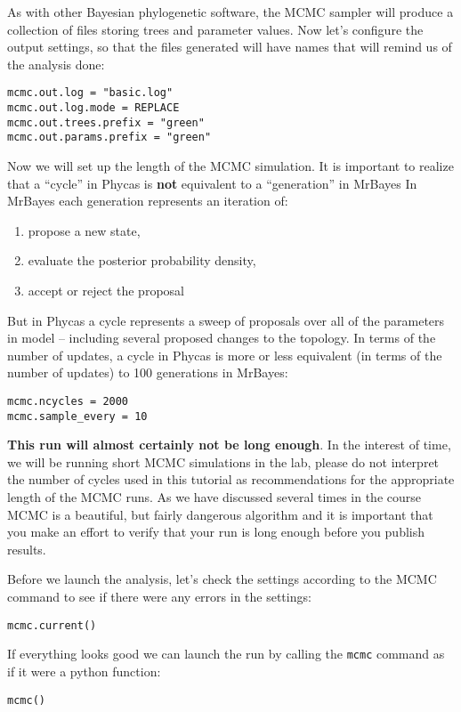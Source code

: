 \documentclass{article}
\newcommand{\cmd}[1]{\texttt{#1}\xspace}
\newcommand{\mb}{MrBayes\xspace}
\newcommand{\phycas}{Phycas\xspace}
\begin{document}
As with other Bayesian phylogenetic software, the MCMC sampler will produce a collection of files storing
trees and parameter values.
Now let's configure the output settings, so that the files generated will have names that 
will remind us of the analysis done:
\begin{verbatim}
mcmc.out.log = "basic.log"
mcmc.out.log.mode = REPLACE
mcmc.out.trees.prefix = "green"
mcmc.out.params.prefix = "green"
\end{verbatim}

Now we will set up the length of the MCMC simulation. 
It is important to realize that a ``cycle'' in \phycas is {\bf not}
equivalent to a ``generation'' in \mb \citet{RonquistH2003}
In \mb each generation represents an iteration of:
\begin{enumerate}
	\item propose a new state,
	\item evaluate the posterior probability density,
	\item accept or reject the proposal
\end{enumerate}
But in \phycas a cycle represents a sweep of proposals over all of the parameters
in model -- including several proposed changes to the topology.
In terms of the number of updates, a cycle in \phycas is more or less equivalent (in terms 
of the number of updates) to 100 generations in \mb:
\begin{verbatim}
mcmc.ncycles = 2000
mcmc.sample_every = 10
\end{verbatim}
{\bf This run will almost certainly not be long enough}.
In the interest of time, we will be running short MCMC simulations in the lab, please do
not interpret the number of cycles used in this tutorial 
as recommendations for the appropriate length of the MCMC runs.
As we have discussed several times in the course MCMC is a beautiful, but
fairly dangerous algorithm and it is important that you make an 
effort to verify that your run is long enough before you publish
results.


Before we launch the analysis, let's check the settings according to the MCMC command
to see if there were any errors in the settings:
\begin{verbatim}
mcmc.current()
\end{verbatim}

If everything looks good we can launch the run by calling the \cmd{mcmc} command
as if it were a python function:
\begin{verbatim}
mcmc()
\end{verbatim}
\end{document}
